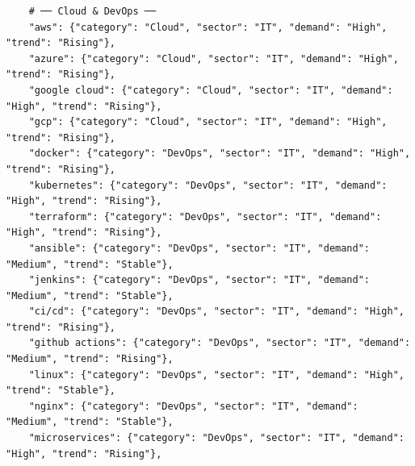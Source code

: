 \documentclass[12pt,a4paper]{report}
\begin{document}
\begin{verbatim}
    # ── Cloud & DevOps ──
    "aws": {"category": "Cloud", "sector": "IT", "demand": "High", "trend": "Rising"},
    "azure": {"category": "Cloud", "sector": "IT", "demand": "High", "trend": "Rising"},
    "google cloud": {"category": "Cloud", "sector": "IT", "demand": "High", "trend": "Rising"},
    "gcp": {"category": "Cloud", "sector": "IT", "demand": "High", "trend": "Rising"},
    "docker": {"category": "DevOps", "sector": "IT", "demand": "High", "trend": "Rising"},
    "kubernetes": {"category": "DevOps", "sector": "IT", "demand": "High", "trend": "Rising"},
    "terraform": {"category": "DevOps", "sector": "IT", "demand": "High", "trend": "Rising"},
    "ansible": {"category": "DevOps", "sector": "IT", "demand": "Medium", "trend": "Stable"},
    "jenkins": {"category": "DevOps", "sector": "IT", "demand": "Medium", "trend": "Stable"},
    "ci/cd": {"category": "DevOps", "sector": "IT", "demand": "High", "trend": "Rising"},
    "github actions": {"category": "DevOps", "sector": "IT", "demand": "Medium", "trend": "Rising"},
    "linux": {"category": "DevOps", "sector": "IT", "demand": "High", "trend": "Stable"},
    "nginx": {"category": "DevOps", "sector": "IT", "demand": "Medium", "trend": "Stable"},
    "microservices": {"category": "DevOps", "sector": "IT", "demand": "High", "trend": "Rising"},


\end{verbatim}
\end{document}
